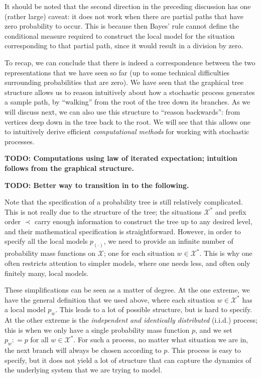 \documentclass[11pt]{book}
\newcommand{\states}{\mathcal{X}}
\newcommand{\coloneqq}{:\!=}
\begin{document}
It should be noted that the second direction in the preceding discussion has one (rather large) caveat: it does not work when there are partial paths that have zero probability to occur. This is because then Bayes' rule cannot define the conditional measure required to construct the local model for the situation corresponding to that partial path, since it would result in a division by zero.

To recap, we can conclude that there is indeed a correspondence between the two representations that we have seen so far (up to some technical difficulties surrounding probabilities that are zero). We have seen that the graphical tree structure allows us to reason intuitively about how a stochastic process generates a sample path, by ``walking'' from the root of the tree down its branches. As we will discuss next, we can also use this structure to ``reason backwards'': from vertices deep down in the tree back to the root. We will see that this allows one to intuitively derive efficient \emph{computational methods} for working with stochastic processes. 


 {\bf TODO: Computations using law of iterated expectation; intuition follows from the graphical structure.}

{\bf TODO: Better way to transition in to the following.}

Note that the specification of a probability tree is still relatively complicated. This is not really due to the structure of the tree; the situations $\states^*$ and prefix order $\prec$ carry enough information to construct the tree up to any desired level, and their mathematical specification is straightforward. However, in order to specify all the local models $p_{(\cdot)}$, we need to provide an infinite number of probability mass functions on $\states$; one for each situation $w\in\states^*$. This is why one often restricts attention to simpler models, where one needs less, and often only finitely many, local models.

These simplifications can be seen as a matter of degree. At the one extreme, we have the general definition that we used above, where each situation $w\in\states^*$ has a local model $p_w$. This leads to a lot of possible structure, but is hard to specify. At the other extreme is the \emph{independent and identically distributed} (i.i.d.) process; this is when we only have a single probability mass function $p$, and we set $p_w\coloneqq p$ for all $w\in\states^*$. For such a process, no matter what situation we are in, the next branch will always be chosen according to $p$. This process is easy to specify, but it does not yield a lot of structure that can capture the dynamics of the underlying system that we are trying to model.
\end{document}
